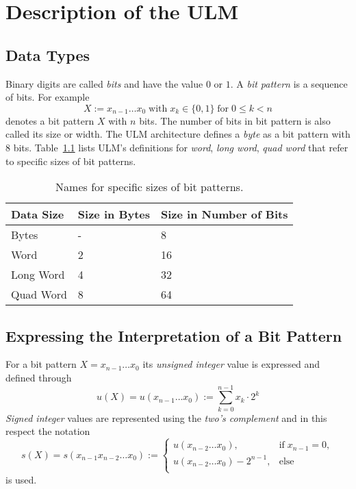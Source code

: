 \documentclass[
   a4paper,
   twoside,
   bringhurst,
   palatino,
   english,
   titlepage,
   fleqn
]{refman}
\begin{document}
   \dominitoc
   \dominilof
   \dominilot

   
   \cleardoublepage
   \thispagestyle{empty}
   \tableofcontents

    \chapter{Description of the ULM}

    \section{Data Types}

    Binary digits are called \textit{bits} and have the value $0$ or $1$. A
    \textit{bit pattern} is a sequence of bits. For example
    \[
	X := x_{n-1}\dots x_0\;\text{with}\;x_k \in \{0, 1\}\;\text{for}\;0
	\leq k < n
    \]
    denotes a bit pattern $X$ with $n$ bits. The number of bits in bit pattern
    is also called its size or width. The ULM architecture defines a
    \textit{byte} as a bit pattern with 8 bits. Table~\ref{tab.data} lists
    ULM's definitions for \textit{word}, \textit{long word}, \textit{quad word}
    that refer to specific sizes of bit patterns.

    


    \begin{table}[t]
    \begin{center}
    \begin{tabular}{lll}
    \hline
    Data Size & Size in Bytes & Size in Number of Bits \\
    \hline
    Bytes     & -   & 8 \\
    Word      & 2   & 16 \\
    Long Word & 4   & 32 \\
    Quad Word & 8   & 64 \\
    \hline
    \end{tabular}
    \end{center}
    \label{tab.data}
    \caption{Names for specific sizes of bit patterns.}
    \end{table}


    \section{Expressing the Interpretation of a Bit Pattern}

    For a bit pattern $X =  x_{n-1}\dots x_0$ its \textit{unsigned integer}
    value is expressed and defined through
    \[
	u(X) = u(x_{n-1}\dots x_0) := \sum\limits_{k=0}^{n-1} x_k \cdot 2^k
    \]
    \textit{Signed integer} values are represented using the \textit{two's
    complement} and in this respect the notation
    \[
	s(X) = s(x_{n-1}x_{n-2}\dots x_0) :=
	\begin{cases}
	u(x_{n-2}\dots x_0),		& \text{if}\; x_{n-1} = 0, \\
	u(x_{n-2}\dots x_0) - 2^{n-1},	& \text{else} \\
	\end{cases}
    \]
    is used.
\end{document}
